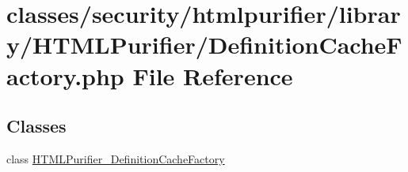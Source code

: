\hypertarget{DefinitionCacheFactory_8php}{\section{classes/security/htmlpurifier/library/\+H\+T\+M\+L\+Purifier/\+Definition\+Cache\+Factory.php File Reference}
\label{DefinitionCacheFactory_8php}
}
\subsection*{Classes}
\begin{DoxyCompactItemize}
\item 
class \hyperlink{classHTMLPurifier__DefinitionCacheFactory}{H\+T\+M\+L\+Purifier\+\_\+\+Definition\+Cache\+Factory}
\end{DoxyCompactItemize}
